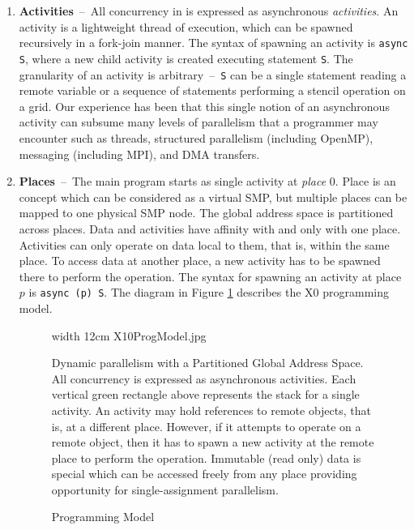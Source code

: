 \begin{enumerate}
\item{\bf Activities}~--~All concurrency in \Xten{} is expressed as asynchronous {\em activities}. An activity is a lightweight thread of execution, which can be spawned recursively in a fork-join manner. The syntax of spawning an activity is {\tt async S}, where a new child activity is created executing statement {\tt S}. The granularity of an activity is arbitrary~--~{\tt S} can be a single statement reading a remote variable or a sequence of statements performing a stencil operation on a grid.  Our experience has been that this single notion of an asynchronous activity can subsume many levels of parallelism that  a programmer may encounter such as threads, structured parallelism (including OpenMP), messaging (including MPI), and DMA transfers.  
\item{\bf Places}~--~The main program starts as single activity at {\em place} 0. Place is an \Xten{} concept which can be considered as a virtual SMP, but multiple places can be mapped to one physical SMP node. The global address space is partitioned across places. Data and activities have affinity with and only with one place. Activities can only operate on data local to them, that is, within the same place. To access data at another place, a new activity has to be spawned there to perform the operation. The syntax for spawning an activity at place $p$ is {\tt async (p) S}. The diagram in Figure \ref{fig 1} describes the X0 programming model.

\begin{figure}
        \begin{center}
        \pdfimage width 12cm {X10ProgModel.jpg}
        \end{center}

Dynamic parallelism with a Partitioned Global Address Space. All
concurrency is expressed as asynchronous activities.  Each vertical
green rectangle above represents the stack for a single activity. An
activity may hold references to remote objects, that is, at a
different place.  However, if it attempts to operate on a remote
object, then it has to spawn a new activity at the remote place to
perform the operation.  Immutable (read only) data is special which
can be accessed freely from any place providing opportunity for
single-assignment parallelism.
\caption{\Xten{} Programming Model}
\label{fig 1}

\end{figure}



\end{enumerate}

